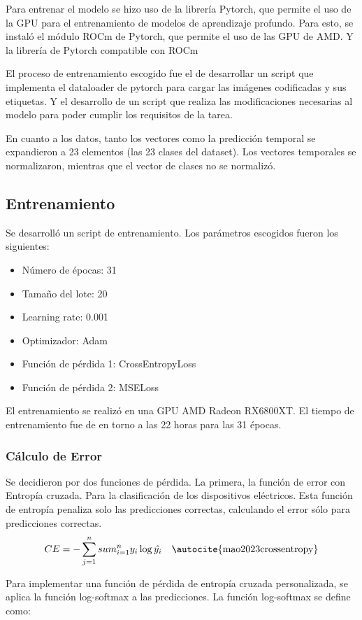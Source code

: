 Para entrenar el modelo se hizo uso de la librería Pytorch, que permite el uso de la GPU para el entrenamiento de modelos de aprendizaje profundo.
Para esto, se instaló el módulo ROCm de Pytorch, que permite el uso de las GPU de AMD. Y la librería de Pytorch compatible con ROCm

El proceso de entrenamiento escogido fue el de desarrollar un script que implementa el dataloader de pytorch para cargar las imágenes codificadas y sus etiquetas. Y el desarrollo de un script que realiza las modificaciones necesarias al modelo para poder cumplir los requisitos de la tarea.  

En cuanto a los datos, tanto los vectores como la predicción temporal se expandieron a 23 elementos (las 23 clases del dataset). Los vectores temporales se normalizaron, mientras que el vector de clases no se normalizó.

\subsection{Entrenamiento}
Se desarrolló un script de entrenamiento. Los parámetros escogidos fueron los siguientes:
\begin{itemize}
    \item Número de épocas: 31
    \item Tamaño del lote: 20
    \item Learning rate: 0.001
    \item Optimizador: Adam
    \item Función de pérdida 1: CrossEntropyLoss
    \item Función de pérdida 2: MSELoss
\end{itemize}

El entrenamiento se realizó en una GPU AMD Radeon RX6800XT. El tiempo de entrenamiento fue de en torno a las 22 horas para las 31 épocas.

\subsubsection{Cálculo de Error}
Se decidieron por dos funciones de pérdida. La primera, la función de error con Entropía cruzada. Para la clasificación de los dispositivos eléctricos. Esta función de entropía penaliza solo las predicciones correctas, calculando el error sólo para predicciones correctas.
$$
CE=-\sum_{j=1}^{n}sum_{i=1}^{n} y_{i}\log{\hat{y_{i}}} \quad \text{\autocite{mao2023crossentropy}}
$$

Para implementar una función de pérdida de entropía cruzada personalizada, se aplica la función log-softmax a las predicciones. La función log-softmax se define como:

